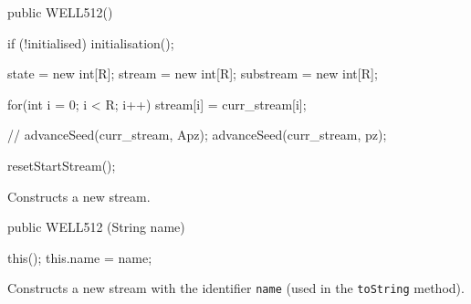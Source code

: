 \begin{code}
   public WELL512() \begin{hide} {
      if (!initialised)
         initialisation();

      state = new int[R];
      stream = new int[R];
      substream = new int[R];

      for(int i = 0; i < R; i++)
         stream[i] = curr_stream[i];

//      advanceSeed(curr_stream, Apz);
      advanceSeed(curr_stream, pz);

      resetStartStream();
   } \end{hide}
\end{code}
\begin{tabb} Constructs a new stream.
\end{tabb}
\begin{code}

   public WELL512 (String name) \begin{hide} {
      this();
      this.name = name;
   } \end{hide}
\end{code}
\begin{tabb} Constructs a new stream with the identifier \texttt{name}
  (used in the \texttt{toString} method).
\end{tabb}
\begin{htmlonly}
\end{htmlonly}

